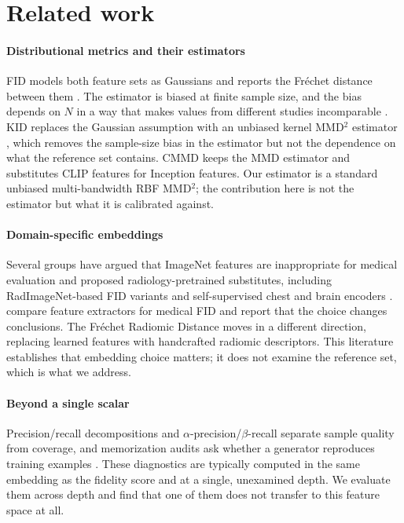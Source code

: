 \documentclass[preprint,12pt,authoryear]{elsarticle}
\begin{document}
\section{Related work}
\label{sec:related}

\paragraph{Distributional metrics and their estimators}
FID models both feature sets as Gaussians and reports the Fr\'echet distance
between them \citep{heusel2017gans}. The estimator is biased at finite sample
size, and the bias depends on $N$ in a way that makes values from different
studies incomparable \citep{chong2020effectively}. KID
\citep{binkowski2018demystifying} replaces the Gaussian assumption with an
unbiased kernel MMD$^2$ estimator \citep{gretton2012kernel}, which removes the
sample-size bias in the estimator but not the dependence on what the reference
set contains. CMMD \citep{jayasumana2024cmmd} keeps the MMD estimator and
substitutes CLIP features for Inception features. Our estimator is a standard
unbiased multi-bandwidth RBF MMD$^2$; the contribution here is not the
estimator but what it is calibrated against.

\paragraph{Domain-specific embeddings}
Several groups have argued that ImageNet features are inappropriate for medical
evaluation and proposed radiology-pretrained substitutes, including
RadImageNet-based FID variants \citep{dohmen2025similarity} and self-supervised
chest and brain encoders \citep{perezrad}. \citet{woodland2024feature}
compare feature extractors for medical FID and report that the choice changes
conclusions. The Fr\'echet Radiomic Distance \citep{konz2025frd} moves in a
different direction, replacing learned features with handcrafted radiomic
descriptors. This literature establishes that embedding choice matters; it does
not examine the reference set, which is what we address.

\paragraph{Beyond a single scalar}
Precision/recall decompositions \citep{sajjadi2018assessing,
kynkaanniemi2019pr} and $\alpha$-precision/$\beta$-recall
\citep{alaa2022faithful} separate sample quality from coverage, and
memorization audits ask whether a generator reproduces training examples
\citep{carlini2023extracting, akbar2025beware}. These diagnostics are typically
computed in the same embedding as the fidelity score and at a single, unexamined
depth. We evaluate them across depth and find that one of them does not
transfer to this feature space at all.
\end{document}
